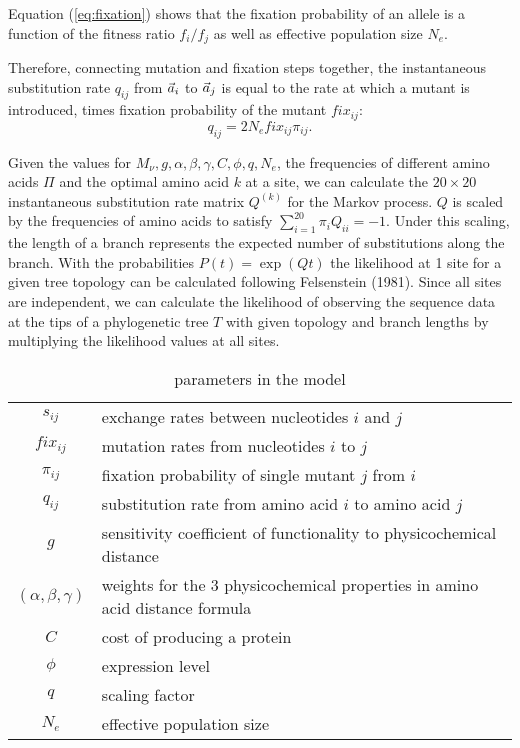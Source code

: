 Equation (\ref{eq:fixation}) shows that the fixation probability of an allele is a function of the fitness ratio $f_i/f_j$ as well as effective population size $N_e$.


Therefore, connecting mutation and fixation steps together, the instantaneous substitution rate $q_{ij}$ from $\vec{a}_i$ to $\vec{a}_j$ is equal to the rate at which a mutant is introduced,  times fixation probability of the mutant $fix_{ij}$:
\begin{equation}
q_{ij} = 2N_e fix_{ij} \pi_{ij}.
\label{eq:subrate}
\end{equation}


Given the values for $M_{\nu},g, \alpha, \beta, \gamma, C, \phi, q, N_e$, the frequencies of different amino acids $\Pi$ and the optimal amino acid $k$ at a site, we can calculate the $20 \times 20$ instantaneous substitution rate matrix $Q^{(k)}$ for the Markov process. 
$Q$ is scaled by the frequencies of amino acids to satisfy $\sum_{i=1}^{20} \pi_i Q_{ii}= -1$.
Under this scaling, the length of a branch represents the expected number of substitutions along the branch.
With the probabilities $P(t)  = \exp\left(Q t\right)$ the likelihood at 1 site for a given tree topology can be calculated following Felsenstein (1981).
Since all sites are independent, we can calculate the likelihood of observing the sequence data at the tips of a phylogenetic tree $T$ with given topology and branch lengths by multiplying the likelihood values at all sites.\\

\begin{table}[h]
\centering
\caption{parameters in the model}
\begin{tabular}{ c p{10cm} }
\hline
$s_{ij}$ & exchange rates between nucleotides $i$ and $j$ \\
$fix_{ij}$ & mutation rates from nucleotides $i$ to $j$\\
$\pi_{ij}$ & fixation probability of single mutant $j$ from $i$\\
$q_{ij}$ & substitution rate from amino acid $i$ to amino acid $j$\\
$g$       & sensitivity coefficient of functionality to physicochemical distance \\
$(\alpha,\beta,\gamma)$ & weights for the 3 physicochemical properties in amino acid distance formula \\
$C$ & cost of producing a protein\\
$\phi$ & expression level \\
$q$ & scaling factor \\
$N_e$ & effective population size \\
\hline
\end{tabular}

\label{tb: para}
\end{table}

